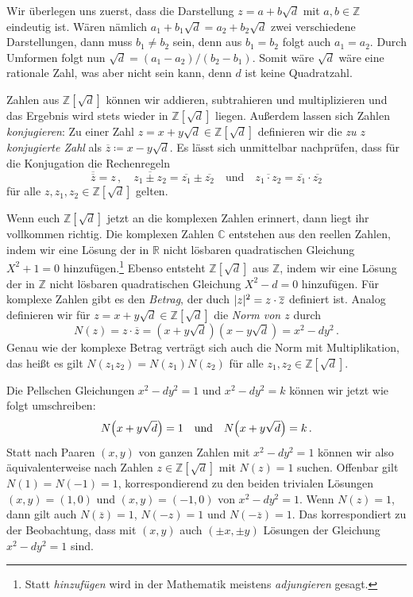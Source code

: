 Wir überlegen uns zuerst, dass die Darstellung $z=a+b\sqrt{d}$ mit $a,b\in \mathbb Z$ eindeutig ist. Wären nämlich $a_1+b_1\sqrt{d}=a_2+b_2\sqrt{d}$ zwei verschiedene Darstellungen, dann muss $b_1\neq b_2$ sein, denn aus $b_1=b_2$ folgt auch $a_1=a_2$. Durch Umformen folgt nun $\sqrt{d}=(a_1-a_2)/(b_2-b_1)$. Somit wäre $\sqrt{d}$ wäre eine rationale Zahl, was aber nicht sein kann, denn $d$ ist keine Quadratzahl.

Zahlen aus $\mathbb Z[\sqrt{d}]$ können wir addieren, subtrahieren und multiplizieren und das Ergebnis wird stets wieder in $\mathbb Z[\sqrt{d}]$ liegen. Außerdem lassen sich Zahlen \emph{konjugieren}: Zu einer Zahl $z=x+y\sqrt{d}\in\mathbb Z[\sqrt{d}]$ definieren wir die \emph{zu $z$ konjugierte Zahl} als $\overline{z}\coloneqq x-y\sqrt{d}$. Es lässt sich unmittelbar nachprüfen, dass für die Konjugation die Rechenregeln
\begin{equation*}
	\overline{\overline{z}}=z\,,\quad \overline{z_1\pm z_2}=\overline {z_1}\pm \overline{z_2}\quad\text{und}\quad \overline{z_1\cdot z_2}=\overline{z_1}\cdot\overline{z_2}
\end{equation*}
für alle $z,z_1,z_2\in\mathbb Z[\sqrt{d}]$ gelten. 

Wenn euch $\mathbb Z[\sqrt{d}]$ jetzt an die komplexen Zahlen erinnert, dann liegt ihr vollkommen richtig. Die komplexen Zahlen $\mathbb C$ entstehen aus den reellen Zahlen, indem wir eine Lösung der in $\mathbb R$ nicht lösbaren quadratischen Gleichung $X^2+1=0$ hinzufügen.\footnote{Statt \emph{hinzufügen} wird in der Mathematik meistens \emph{adjungieren} gesagt.} Ebenso entsteht $\mathbb Z[\sqrt{d}]$ aus $\mathbb Z$, indem wir eine Lösung der in $\mathbb Z$ nicht lösbaren quadratischen Gleichung $X^2-d=0$ hinzufügen. Für komplexe Zahlen gibt es den \emph{Betrag}, der duch $\lvert z\rvert^2=z\cdot \overline{z}$ definiert ist. Analog definieren wir für $z=x+y\sqrt{d}\in\mathbb Z[\sqrt{d}]$ die \emph{Norm von $z$} durch
\begin{equation*}
	N(z)=z\cdot \overline z=\left(x+y\sqrt{d}\right)\left(x-y\sqrt{d}\right)=x^2-dy^2\,.
\end{equation*}
Genau wie der komplexe Betrag verträgt sich auch die Norm mit Multiplikation, das heißt es gilt $N(z_1z_2)=N(z_1)N(z_2)$ für alle $z_1,z_2\in\mathbb Z[\sqrt{d}]$.

Die Pellschen Gleichungen $x^2-dy^2=1$ und $x^2-dy^2=k$ können wir jetzt wie folgt umschreiben:
\begin{equation*}
	N\parens*{x+y\sqrt{d}}=1\quad\text{und}\quad N\parens*{x+y\sqrt{d}}=k\,.
\end{equation*}
Statt nach Paaren $(x,y)$ von ganzen Zahlen mit $x^2-dy^2=1$ können wir also äquivalenterweise nach Zahlen $z\in\mathbb Z[\sqrt{d}]$ mit $N(z)=1$ suchen. Offenbar gilt $N(1)=N(-1)=1$, korrespondierend zu den beiden trivialen Lösungen $(x,y)=(1,0)$ und $(x,y)=(-1,0)$ von $x^2-dy^2=1$. Wenn $N(z)=1$, dann gilt auch $N(\overline{z})=1$, $N(-z)=1$ und $N(-\overline{z})=1$. Das korrespondiert zu der Beobachtung, dass mit $(x,y)$ auch $(\pm x,\pm y)$ Lösungen der Gleichung $x^2-dy^2=1$ sind.

